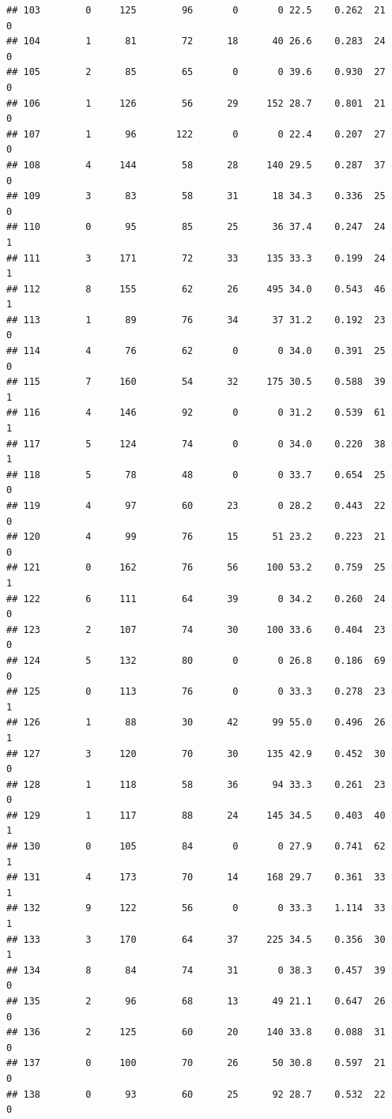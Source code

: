 \documentclass[11pt, a4paper]{article}\usepackage[]{graphicx}\usepackage[]{xcolor}
\makeatletter
\newenvironment{kframe}{%
 \def\at@end@of@kframe{}%
 \ifinner\ifhmode%
  \def\at@end@of@kframe{\end{minipage}}%
  \begin{minipage}{\columnwidth}%
 \fi\fi%
 \def\FrameCommand##1{\hskip\@totalleftmargin \hskip-\fboxsep
 \colorbox{shadecolor}{##1}\hskip-\fboxsep
     \hskip-\linewidth \hskip-\@totalleftmargin \hskip\columnwidth}%
 \MakeFramed {\advance\hsize-\width
   \@totalleftmargin\z@ \linewidth\hsize
   \@setminipage}}%
 {\par\unskip\endMakeFramed%
 \at@end@of@kframe}
\newenvironment{knitrout}{}{} %
\makeatother
\begin{document}
\begin{knitrout}
\begin{kframe}
\begin{verbatim}
## 103        0     125        96       0       0 22.5    0.262  21    0
## 104        1      81        72      18      40 26.6    0.283  24    0
## 105        2      85        65       0       0 39.6    0.930  27    0
## 106        1     126        56      29     152 28.7    0.801  21    0
## 107        1      96       122       0       0 22.4    0.207  27    0
## 108        4     144        58      28     140 29.5    0.287  37    0
## 109        3      83        58      31      18 34.3    0.336  25    0
## 110        0      95        85      25      36 37.4    0.247  24    1
## 111        3     171        72      33     135 33.3    0.199  24    1
## 112        8     155        62      26     495 34.0    0.543  46    1
## 113        1      89        76      34      37 31.2    0.192  23    0
## 114        4      76        62       0       0 34.0    0.391  25    0
## 115        7     160        54      32     175 30.5    0.588  39    1
## 116        4     146        92       0       0 31.2    0.539  61    1
## 117        5     124        74       0       0 34.0    0.220  38    1
## 118        5      78        48       0       0 33.7    0.654  25    0
## 119        4      97        60      23       0 28.2    0.443  22    0
## 120        4      99        76      15      51 23.2    0.223  21    0
## 121        0     162        76      56     100 53.2    0.759  25    1
## 122        6     111        64      39       0 34.2    0.260  24    0
## 123        2     107        74      30     100 33.6    0.404  23    0
## 124        5     132        80       0       0 26.8    0.186  69    0
## 125        0     113        76       0       0 33.3    0.278  23    1
## 126        1      88        30      42      99 55.0    0.496  26    1
## 127        3     120        70      30     135 42.9    0.452  30    0
## 128        1     118        58      36      94 33.3    0.261  23    0
## 129        1     117        88      24     145 34.5    0.403  40    1
## 130        0     105        84       0       0 27.9    0.741  62    1
## 131        4     173        70      14     168 29.7    0.361  33    1
## 132        9     122        56       0       0 33.3    1.114  33    1
## 133        3     170        64      37     225 34.5    0.356  30    1
## 134        8      84        74      31       0 38.3    0.457  39    0
## 135        2      96        68      13      49 21.1    0.647  26    0
## 136        2     125        60      20     140 33.8    0.088  31    0
## 137        0     100        70      26      50 30.8    0.597  21    0
## 138        0      93        60      25      92 28.7    0.532  22    0

\end{verbatim}
\end{kframe}
\end{knitrout}
\end{document}
